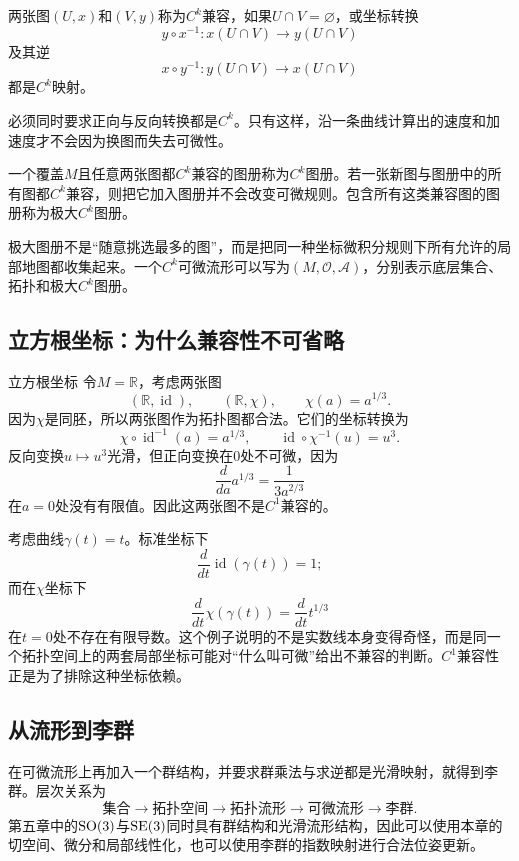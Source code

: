 \begin{definition}[$C^k$兼容]
两张图$(U,x)$和$(V,y)$称为$C^k$兼容，如果$U\cap V=\varnothing$，或坐标转换
\[
    y\circ x^{-1}:x(U\cap V)\to y(U\cap V)
\]
及其逆
\[
    x\circ y^{-1}:y(U\cap V)\to x(U\cap V)
\]
都是$C^k$映射。
\end{definition}

必须同时要求正向与反向转换都是$C^k$。只有这样，沿一条曲线计算出的速度和加速度才不会因为换图而失去可微性。

\begin{definition}[$C^k$图册与极大图册]
一个覆盖$M$且任意两张图都$C^k$兼容的图册称为$C^k$图册。若一张新图与图册中的所有图都$C^k$兼容，则把它加入图册并不会改变可微规则。包含所有这类兼容图的图册称为极大$C^k$图册。
\end{definition}

极大图册不是“随意挑选最多的图”，而是把同一种坐标微积分规则下所有允许的局部地图都收集起来。一个$C^k$可微流形可以写为$(M,\mathcal O,\mathcal A)$，分别表示底层集合、拓扑和极大$C^k$图册。

\subsection{立方根坐标：为什么兼容性不可省略}

\begin{slamcase}{立方根坐标}
令$M=\mathbb R$，考虑两张图
\[
    (\mathbb R,\operatorname{id}),
    \qquad
    (\mathbb R,\chi),
    \qquad
    \chi(a)=a^{1/3}.
\]
因为$\chi$是同胚，所以两张图作为拓扑图都合法。它们的坐标转换为
\[
    \chi\circ\operatorname{id}^{-1}(a)=a^{1/3},
    \qquad
    \operatorname{id}\circ\chi^{-1}(u)=u^3.
\]
反向变换$u\mapsto u^3$光滑，但正向变换在$0$处不可微，因为
\[
    \frac{d}{da}a^{1/3}=\frac{1}{3a^{2/3}}
\]
在$a=0$处没有有限值。因此这两张图不是$C^1$兼容的。

考虑曲线$\gamma(t)=t$。标准坐标下
\[
    \frac{d}{dt}\operatorname{id}(\gamma(t))=1;
\]
而在$\chi$坐标下
\[
    \frac{d}{dt}\chi(\gamma(t))=\frac{d}{dt}t^{1/3}
\]
在$t=0$处不存在有限导数。这个例子说明的不是实数线本身变得奇怪，而是同一个拓扑空间上的两套局部坐标可能对“什么叫可微”给出不兼容的判断。$C^1$兼容性正是为了排除这种坐标依赖。
\end{slamcase}

\subsection{从流形到李群}

在可微流形上再加入一个群结构，并要求群乘法与求逆都是光滑映射，就得到李群。层次关系为
\[
\text{集合}
\to\text{拓扑空间}
\to\text{拓扑流形}
\to\text{可微流形}
\to\text{李群}.
\]
第五章中的$\operatorname{SO}(3)$与$\operatorname{SE}(3)$同时具有群结构和光滑流形结构，因此可以使用本章的切空间、微分和局部线性化，也可以使用李群的指数映射进行合法位姿更新。


